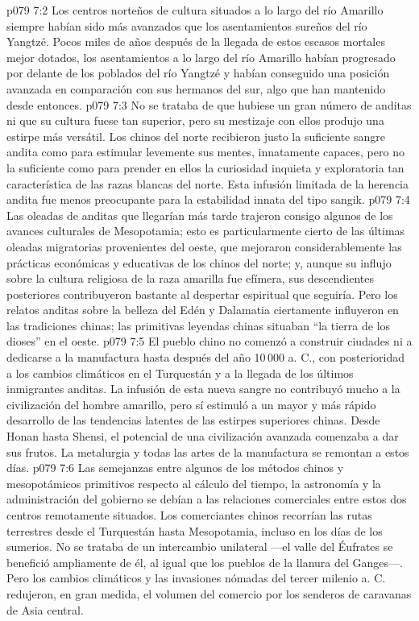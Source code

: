 \vs p079 7:2 Los centros norteños de cultura situados a lo largo del río Amarillo siempre habían sido más avanzados que los asentamientos sureños del río Yangtzé. Pocos miles de años después de la llegada de estos escasos mortales mejor dotados, los asentamientos a lo largo del río Amarillo habían progresado por delante de los poblados del río Yangtzé y habían conseguido una posición avanzada en comparación con sus hermanos del sur, algo que han mantenido desde entonces.
\vs p079 7:3 \pc No se trataba de que hubiese un gran número de anditas ni que su cultura fuese tan superior, pero su mestizaje con ellos produjo una estirpe más versátil. Los chinos del norte recibieron justo la suficiente sangre andita como para estimular levemente sus mentes, innatamente capaces, pero no la suficiente como para prender en ellos la curiosidad inquieta y exploratoria tan característica de las razas blancas del norte. Esta infusión limitada de la herencia andita fue menos preocupante para la estabilidad innata del tipo sangik.
\vs p079 7:4 \pc Las oleadas de anditas que llegarían más tarde trajeron consigo algunos de los avances culturales de Mesopotamia; esto es particularmente cierto de las últimas oleadas migratorias provenientes del oeste, que mejoraron considerablemente las prácticas económicas y educativas de los chinos del norte; y, aunque su influjo sobre la cultura religiosa de la raza amarilla fue efímera, sus descendientes posteriores contribuyeron bastante al despertar espiritual que seguiría. Pero los relatos anditas sobre la belleza del Edén y Dalamatia ciertamente influyeron en las tradiciones chinas; las primitivas leyendas chinas situaban “la tierra de los dioses” en el oeste.
\vs p079 7:5 El pueblo chino no comenzó a construir ciudades ni a dedicarse a la manufactura hasta después del año 10\,000 a. C., con posterioridad a los cambios climáticos en el Turquestán y a la llegada de los últimos inmigrantes anditas. La infusión de esta nueva sangre no contribuyó mucho a la civilización del hombre amarillo, pero sí estimuló a un mayor y más rápido desarrollo de las tendencias latentes de las estirpes superiores chinas. Desde Honan hasta Shensi, el potencial de una civilización avanzada comenzaba a dar sus frutos. La metalurgia y todas las artes de la manufactura se remontan a estos días.
\vs p079 7:6 Las semejanzas entre algunos de los métodos chinos y mesopotámicos primitivos respecto al cálculo del tiempo, la astronomía y la administración del gobierno se debían a las relaciones comerciales entre estos dos centros remotamente situados. Los comerciantes chinos recorrían las rutas terrestres desde el Turquestán hasta Mesopotamia, incluso en los días de los sumerios. No se trataba de un intercambio unilateral ---el valle del Éufrates se benefició ampliamente de él, al igual que los pueblos de la llanura del Ganges---. Pero los cambios climáticos y las invasiones nómadas del tercer milenio a. C. redujeron, en gran medida, el volumen del comercio por los senderos de caravanas de Asia central.
